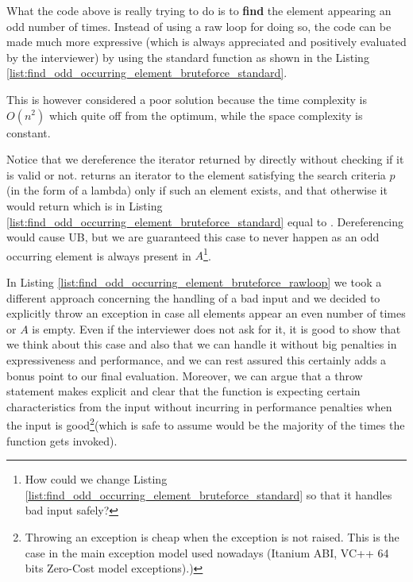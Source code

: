What the code above is really trying to do is to \textbf{find} the element appearing an odd number of times. Instead of using a raw loop for doing so, the code can be made much more expressive (which is always appreciated and positively evaluated by the interviewer) by using the standard  function as shown in the Listing \ref{list:find_odd_occurring_element_bruteforce_standard}.




This is however considered a poor solution because the time complexity is $O(n^2)$ which quite off from the optimum, while the space complexity is constant. 


Notice that we dereference the iterator returned by  directly without checking if it is valid or not. 
 returns an iterator to the element satisfying the search criteria $p$ (in the form of a lambda)  only if such an element exists, and that otherwise it would return  which is in Listing \ref{list:find_odd_occurring_element_bruteforce_standard} equal to . Dereferencing  would cause UB, but we are guaranteed this case to never happen as an odd occurring element is always present in $A$\footnote{How could we change Listing \ref{list:find_odd_occurring_element_bruteforce_standard} so that it handles bad input safely?}.

In Listing \ref{list:find_odd_occurring_element_bruteforce_rawloop} we took a different approach concerning the handling of a bad input and we decided to explicitly throw an exception in case all elements appear an even number of times or $A$ is empty. 
Even if the interviewer does not ask for it, it is good to show that we think about this case and also that we can handle it without big penalties in expressiveness and performance, and we can rest assured this certainly adds a bonus point to our final evaluation. 
Moreover, we can argue that a throw statement makes explicit and clear that the function is expecting certain characteristics from the input without incurring in performance penalties when the input is good\footnote{Throwing an exception is cheap when the exception is not raised. This is the case in the main exception model used nowadays (Itanium ABI, VC++ 64 bits Zero-Cost model exceptions)\cite{cit:web:openstd_exception}.)}(which is safe to assume would be the majority of the times the function gets invoked).


